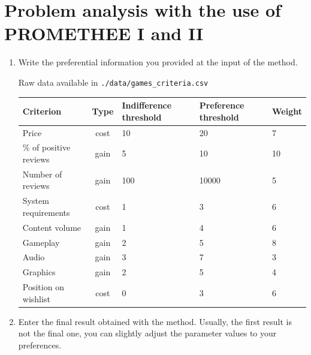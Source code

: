 \documentclass{article}
\begin{document}

\clearpage

\section{Problem analysis with the use of PROMETHEE I and II}

\begin{enumerate}

    \item Write the preferential information you provided at the input of the method.

    Raw data available in \verb|./data/games_criteria.csv|

    \begin{center}
    \begin{tabular}{l|c|m{6em}|m{6em}|l}
    Criterion & Type & Indifference threshold & Preference threshold & Weight \\
    \hline
    \hline
    Price & cost & 10 & 20 & 7 \\
    \% of positive reviews & gain & 5 & 10 & 10 \\
    Number of reviews & gain & 100 & 10000 & 5 \\
    System requirements & cost & 1 & 3 & 6 \\
    Content volume & gain & 1 & 4 & 6 \\
    Gameplay & gain & 2 & 5 & 8 \\
    Audio & gain & 3 & 7 & 3 \\
    Graphics & gain & 2 & 5 & 4 \\
    Position on wishlist & cost & 0 & 3 & 6 \\

    \end{tabular}
    \end{center}

    \item Enter the final result obtained with the method. Usually, the first result is not the final one, you can
    slightly adjust the parameter values to your preferences.



\end{enumerate}
\end{document}
